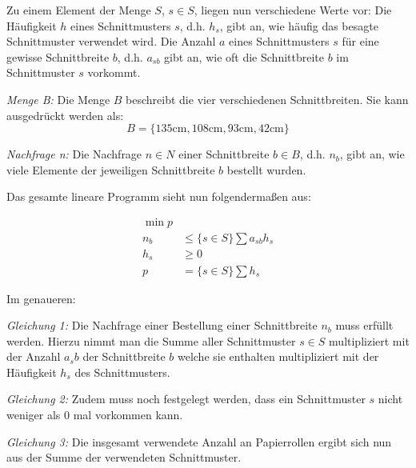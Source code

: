 Zu einem Element der Menge $S$, $s \in S$, liegen nun verschiedene Werte vor:
Die Häufigkeit $h$ eines Schnittmusters $s$, d.h. $h_s$, gibt an, wie häufig das besagte Schnittmuster verwendet wird.
Die Anzahl $a$ eines Schnittmusters $s$ für eine gewisse Schnittbreite $b$, d.h. $a_{sb}$ gibt an, wie oft die Schnittbreite $b$ im Schnittmuster $s$ vorkommt.

\emph{Menge B:} Die Menge $B$ beschreibt die vier verschiedenen Schnittbreiten. Sie kann ausgedrückt werden als: 
\[ B = \{135\text{cm},108\text{cm},93\text{cm},42\text{cm}\} \]

\emph{Nachfrage n:} Die Nachfrage $n \in N$ einer Schnittbreite $b \in B$, d.h. $n_b$, gibt an, wie viele Elemente der jeweiligen Schnittbreite $b$ bestellt wurden. 


Das gesamte lineare Programm sieht nun folgendermaßen aus:
 
\begin{align*}
\min p & \\
 n_b  & \leq \{s \in S\}\sum a_{sb} h_s\\
h_s & \geq 0 \\
p & = \{s \in S\}\sum h_s 
\end{align*}

Im genaueren:


\emph{Gleichung 1:} Die Nachfrage einer Bestellung einer Schnittbreite $n_b$ muss erfüllt werden. Hierzu nimmt man die Summe aller Schnittmuster $s \in S$ multipliziert mit der Anzahl $a_sb$ der Schnittbreite $b$ welche sie enthalten multipliziert mit der Häufigkeit $h_s$ des Schnittmusters.

\emph{Gleichung 2:} Zudem muss noch festgelegt werden, dass ein Schnittmuster $s$ nicht weniger als 0 mal vorkommen kann.

\emph{Gleichung 3:} Die insgesamt verwendete Anzahl an Papierrollen ergibt sich nun aus der Summe der verwendeten Schnittmuster.
 
